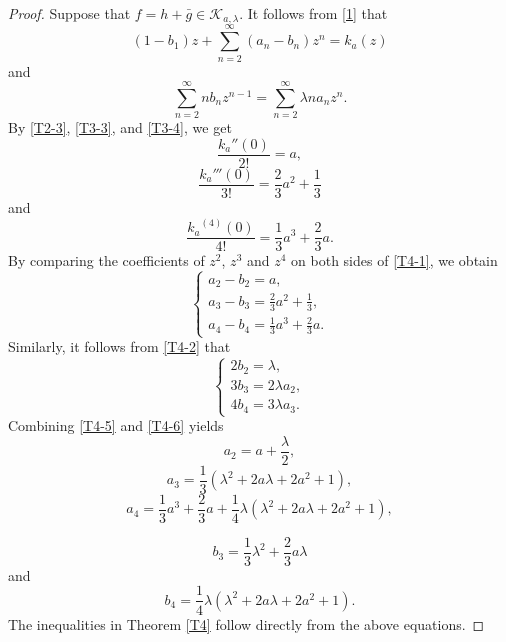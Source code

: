 \documentclass[11pt, reqno]{amsart}
\numberwithin{equation}{section}
\begin{document}
\begin{proof} Suppose that $f=h+\bar{g}\in\mathcal{K}_{a,\lambda}$.
	It follows from \eqref{1} that
    \begin{equation}\label{T4-1}
        \left(1-b_1\right)z+\sum\limits_{n=2}^{\infty}(a_n-b_n)z^n=k_a(z)
    \end{equation}
    and
    \begin{equation}\label{T4-2}
        \sum\limits_{n=2}^{\infty}nb_nz^{n-1}=\sum\limits_{n=2}^{\infty}\lambda na_nz^n.
    \end{equation}
	By \eqref{T2-3}, \eqref{T3-3}, and \eqref{T3-4}, we get %
    $$\dfrac{k_a''(0)}{2!}=a,$$ 
    \begin{equation*}\label{T4-3}
        \dfrac{k_a'''(0)}{3!}=\dfrac{2}{3}a^2+\dfrac{1}{3}
    \end{equation*}
    and 
     \begin{equation*}\label{T4-4}
        \dfrac{{k_a}^{(4)}(0)}{4!}=\dfrac{1}{3}a^3+\dfrac{2}{3}a.
    \end{equation*}
	By comparing the coefficients of $z^2$, $z^3$ and $z^4$ on both sides of \eqref{T4-1}, we obtain
	\begin{equation}\label{T4-5}
		\begin{cases}
			a_2-b_2=a,\\
			a_3-b_3=\frac{2}{3}a^2+\frac{1}{3},\\
			a_4-b_4=\frac{1}{3}a^3+\frac{2}{3}a.
		\end{cases}
	\end{equation}
	Similarly, it follows from \eqref{T4-2} that
	\begin{equation}\label{T4-6}
		\begin{cases}
			2b_2=\lambda,\\
			3b_3=2\lambda a_2,\\
			4b_4=3\lambda a_3.
		\end{cases}
	\end{equation}
   Combining \eqref{T4-5} and \eqref{T4-6} yields
    \begin{equation*}\label{T4-7}
        a_2=a+\dfrac{\lambda}{2},
    \end{equation*}
     \begin{equation*}\label{T4-8}
        a_3=\dfrac{1}{3}\left(\lambda^2+2a\lambda+2a^2+1\right),
    \end{equation*}
     \begin{equation*}\label{T4-9}
        a_4=\dfrac{1}{3}a^3+\dfrac{2}{3}a+
        \dfrac{1}{4}\lambda\left(\lambda^2+2a\lambda+2a^2+1\right),
    \end{equation*}
  
     \begin{equation*}\label{T4-10}
        b_3=\dfrac{1}{3}\lambda^2+\dfrac{2}{3}a\lambda
    \end{equation*}  and 
     \begin{equation*}\label{T4-11}
        b_4=\dfrac{1}{4}\lambda\left(\lambda^2+2a\lambda+2a^2+1\right).
    \end{equation*}
The inequalities in Theorem \ref{T4} follow directly from the above equations.
\end{proof}
\end{document}
